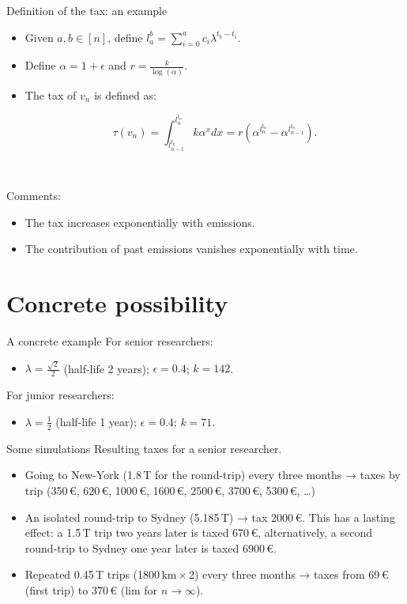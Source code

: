 \documentclass[french, english]{beamer}
\begin{document}
\begin{frame}{Definition of the tax: an example}
    \begin{itemize}
    \item Given $a,b \in [n]$, define $l_a^{b} = \sum_{i = 0}^a c_i \lambda^{t_b - t_i}$.
    \item Define $\alpha = 1 + \epsilon$ and $r = \frac{k}{\log(\alpha)}$.
    \item The tax of $v_n$ is defined as: \begin{tcolorbox}$$ \tau(v_n) = \int_{l_{n-1}^{t_n}}^{l_n^{t_n}} k \alpha^x dx = r (\alpha^{l_n^{t_n}} - \alpha^{l_{n - 1}^{t_n}}).$$\end{tcolorbox}
    \end{itemize}	
    
    \

   Comments:
   \begin{itemize}
   \item The tax increases exponentially with emissions.
   \item The contribution of past emissions vanishes exponentially with time.
   \end{itemize}

\end{frame}

\section{Concrete possibility}
\begin{frame}{A concrete example}
For senior researchers: 
    \begin{itemize}
    	\item $\lambda = \frac{\sqrt{2}}{2}$ (half-life 2 years); $\epsilon = 0.4$; $k = 142$.
	\end{itemize}
For junior researchers: 
    \begin{itemize}
    	\item $\lambda = \frac{1}{2}$ (half-life 1 year); $\epsilon = 0.4$; $k = 71$.
	\end{itemize}
\end{frame}

\begin{frame}{Some simulations}
Resulting taxes for a senior researcher.
    \begin{itemize}
	\item Going to New-York (1.8\,T for the round-trip) every three months → taxes by trip (350\,€, 620\,€, 1000\,€, 1600\,€, 2500\,€, 3700\,€, 5300\,€, …)
	\item An isolated round-trip to Sydney (5.185\,T) → tax 2000\,€. This has a lasting effect: a 1.5\,T trip two years later is taxed 670\,€, alternatively, a second round-trip to Sydney one year later is taxed 6900\,€.
	\item Repeated 0.45\,T trips (1800\,km\,×\,2) every three months → taxes from 69\,€ (first trip) to 370\,€ (lim for $n → \infty$).
	\end{itemize}
\end{frame}
\end{document}
